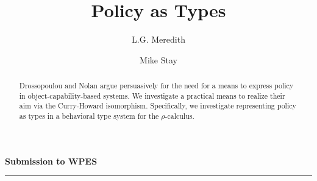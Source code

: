 \documentclass[]{amsart}
\theoremstyle{definition}
\theoremstyle{remark}
\numberwithin{equation}{subsection}
\newcommand{\rhoc}{$\rho$-calculus}
\newcommand{\papertitle}{Policy as Types}
\begin{document}
\lstset{language=erlang}

\setlength{\topmargin}{0in}
\setlength{\textheight}{8.5in}
\setlength{\parskip}{6pt}

\title{\papertitle}

\author{ L.G. Meredith }
\author{ Mike Stay }







\dedicatory{}



\begin{abstract}
\normalsize{ 

  Drossopoulou and Nolan argue persuasively for the need for a means
  to express policy in object-capability-based systems. We investigate
  a practical means to realize their aim via the Curry-Howard
  isomorphism. Specifically, we investigate representing policy as
  types in a behavioral type system for the \rhoc.

}

\end{abstract}

\noindent
{\large \textbf{Submission to WPES}}\\
\rule{6.25in}{0.75pt}\\\\\\

\maketitle
\end{document}
